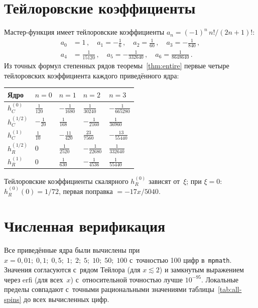 \documentclass[aps,prd,twocolumn,superscriptaddress,nofootinbib,floatfix]{revtex4-2}
\theoremstyle{definition}
\theoremstyle{remark}
\begin{document}
\section{Тейлоровские коэффициенты}
\label{app:taylor}

Мастер-функция имеет тейлоровские коэффициенты
$a_n = (-1)^n\,n!/(2n+1)!$:
\begin{equation}
  \begin{aligned}
    a_0 &= 1\,,\quad a_1 = -\tfrac{1}{6}\,,\quad
    a_2 = \tfrac{1}{60}\,,\quad a_3 = -\tfrac{1}{840}\,,\\
    a_4 &= \tfrac{1}{15120}\,,\quad
    a_5 = -\tfrac{1}{332640}\,,\quad
    a_6 = \tfrac{1}{8648640}\,.
  \end{aligned}
\end{equation}
Из точных формул степенных рядов теоремы~\ref{thm:entire} первые четыре
тейлоровских коэффициента каждого приведённого ядра:
\begin{center}
\renewcommand{\arraystretch}{1.25}
\begin{tabular}{@{}lllll@{}}
  \toprule
  Ядро & $n = 0$ & $n = 1$ & $n = 2$ & $n = 3$ \\
  \midrule
  $h_C^{(0)}$ & $\frac{1}{120}$ & $-\frac{1}{1680}$ &
    $\frac{1}{30240}$ & $-\frac{1}{665280}$ \\[4pt]
  $h_C^{(1/2)}$ & $-\frac{1}{20}$ & $\frac{1}{168}$ &
    $-\frac{1}{2160}$ & $\frac{1}{36960}$ \\[4pt]
  $h_C^{(1)}$ & $\frac{1}{10}$ & $-\frac{11}{420}$ &
    $\frac{23}{7560}$ & $-\frac{13}{55440}$ \\[4pt]
  $h_R^{(1/2)}$ & $0$ & $\frac{1}{2520}$ &
    $-\frac{1}{22680}$ & $\frac{1}{332640}$ \\[4pt]
  $h_R^{(1)}$ & $0$ & $\frac{1}{630}$ &
    $-\frac{1}{4536}$ & $\frac{1}{55440}$ \\
  \bottomrule
\end{tabular}
\end{center}
Тейлоровские коэффициенты скалярного $h_R^{(0)}$ зависят от~$\xi$;
при $\xi = 0$: $h_R^{(0)}(0) = 1/72$, первая поправка $= -17x/5040$.


\section{Численная верификация}
\label{app:numerical}

Все приведённые ядра были вычислены при $x = 0{,}01;\; 0{,}1;\; 0{,}5;\; 1;\; 2;\; 5;\; 10;\;
50;\; 100$ с~точностью 100 цифр в~\texttt{mpmath}. Значения согласуются
с~рядом Тейлора (для $x \lesssim 2$) и замкнутым выражением через erfi
(для всех~$x$) с~относительной точностью лучше $10^{-95}$. Локальные
пределы совпадают с~точными рациональными значениями
таблицы~\ref{tab:all-spins} до всех вычисленных цифр.
\end{document}
